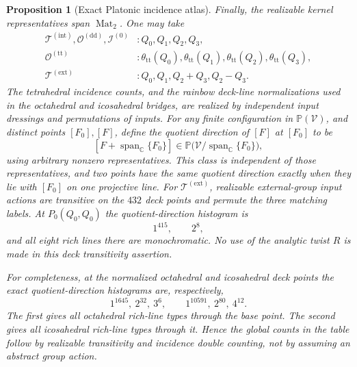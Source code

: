 \documentclass[11pt,letterpaper,onecolumn]{article}
\theoremstyle{plain}
\newtheorem{proposition}[proposition]{Proposition}
\theoremstyle{definition}
\theoremstyle{remark}
\newcommand{\TetInt}{{\mathcal T^{(\mathrm{int})}}}
\newcommand{\TetExt}{{\mathcal T^{(\mathrm{ext})}}}
\newcommand{\OctDD}{{\mathcal O^{(\mathrm{dd})}}}
\newcommand{\OctTT}{{\mathcal O^{(\mathrm{tt})}}}
\newcommand{\IcoZero}{{\mathcal I^{(0)}}}
\newcommand{\Mat}{\operatorname{Mat}}
\newcommand{\Span}{\operatorname{span}}
\begin{document}
\begin{proposition}[Exact Platonic incidence atlas]
Finally, the realizable kernel representatives span \(\Mat_2\).  One may take
\begin{equation}
 \begin{aligned}
  \TetInt,\OctDD,\IcoZero &: Q_0,Q_1,Q_2,Q_3,\\
  \OctTT &: \theta_{\mathrm{tt}}(Q_0),\theta_{\mathrm{tt}}(Q_1),
                  \theta_{\mathrm{tt}}(Q_2),\theta_{\mathrm{tt}}(Q_3),\\
  \TetExt &: Q_0,Q_1,Q_2+Q_3,Q_2-Q_3.
 \end{aligned}
 \label{eq:cert-platonic-spanning-kernels}
\end{equation}
The tetrahedral incidence counts, and the rainbow deck-line normalizations
used in the octahedral and icosahedral bridges, are realized by independent input dressings and permutations of inputs.  For
any finite configuration in \(\mathbb P(\mathscr V)\), and distinct points
\([F_0],[F]\), define the \emph{quotient direction of \([F]\) at
\([F_0]\)} to be
\[
  [F+\Span_{\mathbb C}\{F_0\}]
  \in\mathbb P\bigl(\mathscr V/\Span_{\mathbb C}\{F_0\}\bigr),
\]
using arbitrary nonzero representatives.  This class is independent of
those representatives, and two points have the same quotient direction
exactly when they lie with \([F_0]\) on one projective line.  For
\(\TetExt\), realizable external-group input actions are transitive
on the \(432\) deck points and permute the three matching labels. At
\(P_0(Q_0,Q_0)\) the quotient-direction histogram is
\hypertarget{eq:cert-external-A4-line-buckets}{}
\begin{equation*}
  1^{415},\qquad 2^8,
\end{equation*}
and all eight rich lines there are monochromatic.  No use of the analytic
twist \(R\) is made in this deck transitivity assertion.

For completeness, at the normalized octahedral and icosahedral deck points
the exact quotient-direction histograms are, respectively,
\hypertarget{eq:cert-platonic-line-buckets-summary}{}
\begin{equation*}
  1^{1645},\ 2^{32},\ 3^6,
  \qquad
  1^{10591},\ 2^{80},\ 4^{12}.
\end{equation*}
The first gives all octahedral rich-line types through the base point. The
second gives all icosahedral rich-line types through it.  Hence the global
counts in the table follow by realizable transitivity and incidence double
counting, not by assuming an abstract group action.
\end{proposition}
\end{document}
